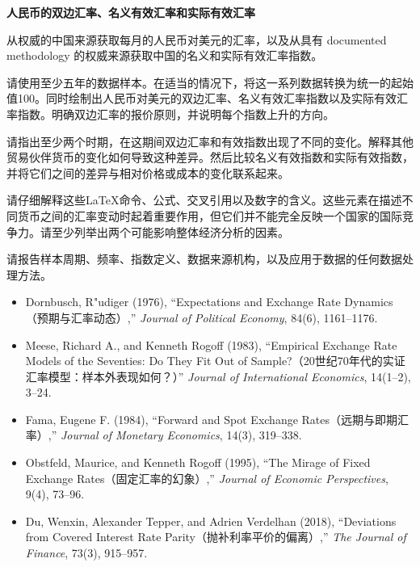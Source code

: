 

\textbf{人民币的双边汇率、名义有效汇率和实际有效汇率}

从权威的中国来源获取每月的人民币对美元的汇率，以及从具有 documented methodology 的权威来源获取中国的名义和实际有效汇率指数。

请使用至少五年的数据样本。在适当的情况下，将这一系列数据转换为统一的起始值100。同时绘制出人民币对美元的双边汇率、名义有效汇率指数以及实际有效汇率指数。明确双边汇率的报价原则，并说明每个指数上升的方向。

请指出至少两个时期，在这期间双边汇率和有效指数出现了不同的变化。解释其他贸易伙伴货币的变化如何导致这种差异。然后比较名义有效指数和实际有效指数，并将它们之间的差异与相对价格或成本的变化联系起来。

请仔细解释这些LaTeX命令、公式、交叉引用以及数字的含义。这些元素在描述不同货币之间的汇率变动时起着重要作用，但它们并不能完全反映一个国家的国际竞争力。请至少列举出两个可能影响整体经济分析的因素。

请报告样本周期、频率、指数定义、数据来源机构，以及应用于数据的任何数据处理方法。




\begin{itemize}

\item Dornbusch, R"udiger (1976),
``Expectations and Exchange Rate Dynamics（预期与汇率动态）,''
\emph{Journal of Political Economy}, 84(6), 1161--1176.

\item Meese, Richard A., and Kenneth Rogoff (1983),
``Empirical Exchange Rate Models of the Seventies: Do They Fit Out of Sample?（20世纪70年代的实证汇率模型：样本外表现如何？）''
\emph{Journal of International Economics}, 14(1--2), 3--24.

\item Fama, Eugene F. (1984),
``Forward and Spot Exchange Rates（远期与即期汇率）,''
\emph{Journal of Monetary Economics}, 14(3), 319--338.

\item Obstfeld, Maurice, and Kenneth Rogoff (1995),
``The Mirage of Fixed Exchange Rates（固定汇率的幻象）,''
\emph{Journal of Economic Perspectives}, 9(4), 73--96.

\item Du, Wenxin, Alexander Tepper, and Adrien Verdelhan (2018),
``Deviations from Covered Interest Rate Parity（抛补利率平价的偏离）,''
\emph{The Journal of Finance}, 73(3), 915--957.

\end{itemize}


